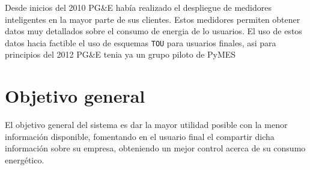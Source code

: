 Desde inicios del 2010 PG\&E había realizado el despliegue de medidores
inteligentes en la mayor parte de sus clientes. Estos medidores permiten
obtener datos muy detallados sobre el consumo de energia de lo usuarios.
El uso de estos datos hacia factible el uso de esquemas \texttt{TOU}
para usuarios finales, asi para principios del 2012 PG\&E tenia ya un
grupo piloto de PyMES

\section{Objetivo general}

El objetivo general del sistema es dar la mayor utilidad posible con la menor
información disponible, fomentando en el usuario final el compartir dicha
información sobre su empresa, obteniendo un mejor control
acerca de su consumo energético.
